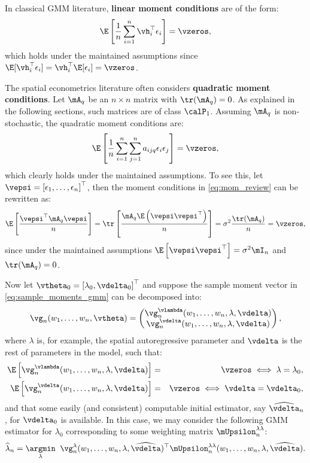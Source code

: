 \documentclass[english,12pt]{book}\usepackage[]{graphicx}\usepackage[]{xcolor}
\begin{document}
In classical GMM literature, \textbf{linear moment conditions} are of the form:
\begin{equation*}
\E\left[\frac{1}{n} \sum_{i=1}^n \vh_i^\top \epsilon_i \right] = \vzeros,
\end{equation*}
which holds under the maintained assumptions since $\E[\vh_i^\top \epsilon_i] = \vh_i^\top \E[\epsilon_i] = \vzeros$.

The spatial econometrics literature often considers \textbf{quadratic moment conditions}. Let $\mA_q$ be an $n \times n$ matrix with $\tr(\mA_q) = 0$. As explained in the following sections, such matrices are of class $\calP_1$. Assuming $\mA_q$ is non-stochastic, the quadratic moment conditions are:
\begin{equation}\label{eq:mom_review}
\E\left[\frac{1}{n} \sum_{i=1}^n \sum_{j=1}^n a_{ijq} \epsilon_i \epsilon_j \right] = \vzeros, 
\end{equation}
%
which clearly holds under the maintained assumptions. To see this, let $\vepsi = \left[\epsilon_1, \ldots ,\epsilon_n\right]^\top$, then the moment conditions in \eqref{eq:mom_review} can be rewritten as:
\begin{equation*}
 \E\left[\frac{\vepsi^\top\mA_q\vepsi}{n}\right] = \tr\left[\frac{\mA_q\E\left(\vepsi\vepsi^\top\right)}{n}\right] = \sigma^2\frac{\tr(\mA_q)}{n} = \vzeros,
\end{equation*}
%
since under the maintained assumptions $\E\left[\vepsi\vepsi^\top\right] = \sigma^2\mI_n$ and $\tr(\mA_q) = 0$.

Now let $\vtheta_0 = \left[\lambda_0, \vdelta_0\right]^\top$ and suppose the sample moment vector in \eqref{eq:sample_moments_gmm} can be decomposed into:
\begin{equation*}
\vg_n(w_1,\ldots ,w_n, \vtheta) = 
\begin{pmatrix}
\vg_n^{\vlambda}(w_1,\ldots,w_n, \lambda, \vdelta) \\
\vg_n^{\vdelta}(w_1,\ldots,w_n, \lambda, \vdelta) 
\end{pmatrix},
\end{equation*}
%
where $\lambda$ is, for example, the spatial autoregressive parameter and $\vdelta$ is the rest of parameters in the model, such that:
\begin{eqnarray*}
\E\left[\vg_n^{\vlambda}(w_1,\ldots,w_n, \lambda, \vdelta)\right] &=& \vzeros \iff \lambda = \lambda_0,\\
\E\left[\vg_n^{\vdelta}(w_1,\ldots,w_n, \lambda, \vdelta)\right] &=& \vzeros \iff \vdelta = \vdelta_0,
\end{eqnarray*}
%
and that some easily (and consistent) computable initial estimator, say $\widehat{\vdelta}_n$, for $\vdelta_0$ is available. In this case, we may consider the following GMM estimator for $\lambda_0$ corresponding to some weighting matrix $\mUpsilon^{\lambda\lambda}_n$:
\begin{equation}\label{eq:gmm_two_step_a}
\widehat{\lambda}_n = \underset{\lambda}{\argmin}\;\;\vg_n^{\lambda}(w_1,\ldots,w_n, \lambda, \widehat{\vdelta})^\top\mUpsilon^{\lambda\lambda}_n(w_1,\ldots,w_n, \lambda, \widehat{\vdelta}).
\end{equation}
\end{document}
